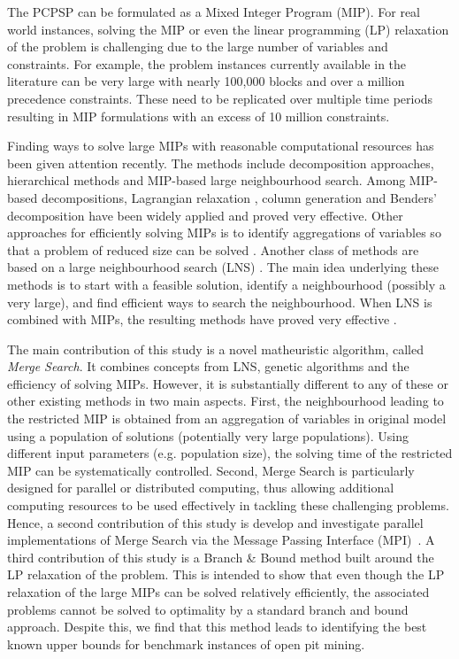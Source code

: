\documentclass[journal]{IEEEtran}
\begin{document}
The PCPSP can be formulated as a Mixed Integer Program (MIP). For real world instances, solving the MIP or even the linear programming (LP) relaxation of the problem is challenging due to the 
large number of variables and constraints. For example, the problem instances currently available in the literature 
can be very large with nearly 100,000 blocks and over a million precedence constraints. These need to be replicated over multiple time periods resulting 
in MIP formulations with an excess of 10 million constraints. 
 
Finding ways to solve large MIPs with reasonable computational resources has been given attention recently. The methods include decomposition approaches, hierarchical methods and MIP-based large neighbourhood search. Among MIP-based decompositions, Lagrangian relaxation \cite{fisher04}, column generation \cite{Wolsey1998} and Benders' decomposition \cite{Geoffrion1972} have been widely applied and proved very effective. Other approaches for efficiently solving MIPs is to identify aggregations of variables so that a problem of reduced size can be solved \cite{BOLAND2009, Litvinchev:2003, Rogers:1991}. Another class of methods are based on a large neighbourhood search (LNS) \cite{Ahuja:2002}. The main idea underlying these methods is to start with a feasible solution, identify a neighbourhood (possibly a very large), and find efficient ways to search the neighbourhood. When LNS is combined with MIPs, the resulting methods have proved very effective \cite{Ahuja:2002,Pisinger2010}. 

The main contribution of this study is a novel matheuristic algorithm, called {\it Merge Search}. It combines concepts from LNS, genetic algorithms \cite{Mitchell:1996} and the efficiency of solving MIPs. However, it is substantially different to any of these or other existing methods in two main aspects. First, the neighbourhood leading to the restricted MIP is obtained from an aggregation of variables in original model using a population of solutions (potentially very large populations). Using different input parameters (e.g. population size), the solving time of the restricted MIP can be systematically controlled. Second, Merge Search is particularly designed for parallel or distributed computing, thus allowing additional computing resources to be used effectively in tackling these challenging problems. Hence, a second contribution of this study is develop and investigate parallel implementations of Merge Search via the Message Passing Interface (MPI)~\cite{Gropp:1994}. A third contribution of this study is a Branch \& Bound method built around the LP relaxation of the problem. This is intended to show that even though the LP relaxation of the large MIPs can be solved relatively efficiently, the associated problems cannot be solved to optimality by a standard branch and bound approach. Despite this, we find that this method leads to identifying the best known upper bounds for benchmark instances of open pit mining. 
\end{document}
